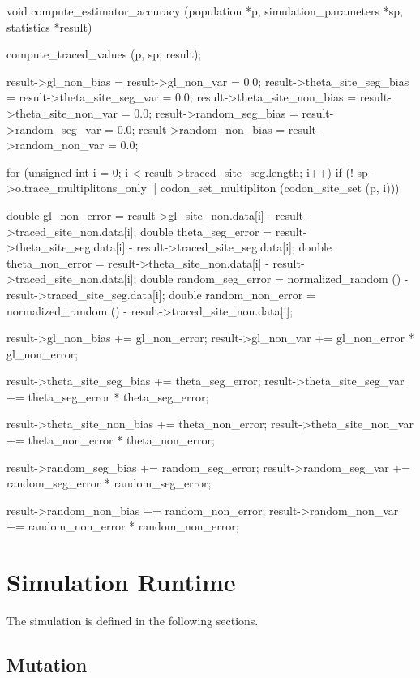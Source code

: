 \documentclass{article}
\begin{document}
\begin{ccode}
void compute_estimator_accuracy (population *p, simulation_parameters *sp, statistics *result) {
  compute_traced_values (p, sp, result);

  result->gl_non_bias		= result->gl_non_var		= 0.0;
  result->theta_site_seg_bias	= result->theta_site_seg_var	= 0.0;
  result->theta_site_non_bias	= result->theta_site_non_var	= 0.0;
  result->random_seg_bias	= result->random_seg_var	= 0.0;
  result->random_non_bias	= result->random_non_var	= 0.0;

  for (unsigned int i = 0; i < result->traced_site_seg.length; i++)
    if (! sp->o.trace_multiplitons_only || codon_set_multipliton (codon_site_set (p, i))) {
      double gl_non_error		= result->gl_site_non.data[i] - result->traced_site_non.data[i];
      double theta_seg_error		= result->theta_site_seg.data[i] - result->traced_site_seg.data[i];
      double theta_non_error		= result->theta_site_non.data[i] - result->traced_site_non.data[i];
      double random_seg_error		= normalized_random () - result->traced_site_seg.data[i];
      double random_non_error		= normalized_random () - result->traced_site_non.data[i];

      result->gl_non_bias		+= gl_non_error;
      result->gl_non_var		+= gl_non_error * gl_non_error;

      result->theta_site_seg_bias 	+= theta_seg_error;
      result->theta_site_seg_var	+= theta_seg_error * theta_seg_error;

      result->theta_site_non_bias	+= theta_non_error;
      result->theta_site_non_var	+= theta_non_error * theta_non_error;

      result->random_seg_bias		+= random_seg_error;
      result->random_seg_var		+= random_seg_error * random_seg_error;

      result->random_non_bias		+= random_non_error;
      result->random_non_var		+= random_non_error * random_non_error;
    }
}
\end{ccode}

  \section{Simulation Runtime}

    The simulation is defined in the following sections.
    
    \subsection{Mutation}
    
\end{document}
